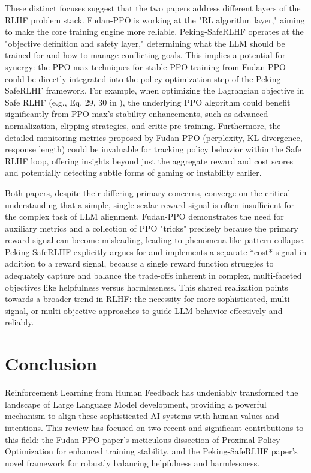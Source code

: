 \documentclass{article} %
\begin{document}
These distinct focuses suggest that the two papers address different layers of the RLHF problem stack. Fudan-PPO is working at the "RL algorithm layer," aiming to make the core training engine more reliable. Peking-SafeRLHF operates at the "objective definition and safety layer," determining what the LLM should be trained for and how to manage conflicting goals. This implies a potential for synergy: the PPO-max techniques for stable PPO training from Fudan-PPO could be directly integrated into the policy optimization step of the Peking-SafeRLHF framework. For example, when optimizing the Lagrangian objective in Safe RLHF (e.g., Eq. 29, 30 in \cite{Dai2023SafeRLHF}), the underlying PPO algorithm could benefit significantly from PPO-max's stability enhancements, such as advanced normalization, clipping strategies, and critic pre-training. Furthermore, the detailed monitoring metrics proposed by Fudan-PPO (perplexity, KL divergence, response length) could be invaluable for tracking policy behavior within the Safe RLHF loop, offering insights beyond just the aggregate reward and cost scores and potentially detecting subtle forms of gaming or instability earlier.

Both papers, despite their differing primary concerns, converge on the critical understanding that a simple, single scalar reward signal is often insufficient for the complex task of LLM alignment. Fudan-PPO demonstrates the need for auxiliary metrics and a collection of PPO "tricks" precisely because the primary reward signal can become misleading, leading to phenomena like pattern collapse. Peking-SafeRLHF explicitly argues for and implements a separate *cost* signal in addition to a reward signal, because a single reward function struggles to adequately capture and balance the trade-offs inherent in complex, multi-faceted objectives like helpfulness versus harmlessness. This shared realization points towards a broader trend in RLHF: the necessity for more sophisticated, multi-signal, or multi-objective approaches to guide LLM behavior effectively and reliably.

\section{Conclusion}
\label{sec:conclusion}

Reinforcement Learning from Human Feedback has undeniably transformed the landscape of Large Language Model development, providing a powerful mechanism to align these sophisticated AI systems with human values and intentions. This review has focused on two recent and significant contributions to this field: the Fudan-PPO paper's meticulous dissection of Proximal Policy Optimization for enhanced training stability, and the Peking-SafeRLHF paper's novel framework for robustly balancing helpfulness and harmlessness.  
\end{document}
